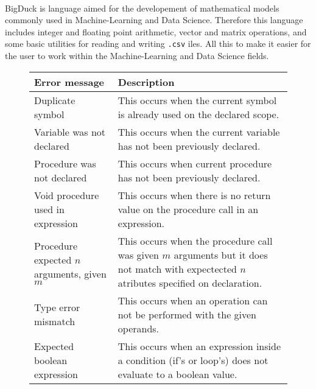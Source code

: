 \paragraph{} BigDuck is language aimed for the developement of mathematical
models commonly used in Machine-Learning and Data Science. Therefore this
language includes integer and floating point arithmetic, vector and matrix
operations, and some basic utilities for reading and writing \texttt{.csv} 
iles. All this to make it easier for the user to work within the
Machine-Learning and Data Science fields.

\begin{figure}[h]
    \centering
    \begin{tabular}{p{1.5in}p{2.5in}}
        \toprule
        \textbf{Error message} & \textbf{Description}\\

        \midrule Duplicate symbol &
        This occurs when the current symbol is already used on the declared
        scope.\\

        \midrule Variable was not \newline declared &
        This occurs when the current variable has not been \newline previously
        declared.\\

        \midrule Procedure was not \newline declared &
        This occurs when current procedure has not been \newline previously
        declared.\\

        \midrule Void procedure used \newline in expression &
        This occurs when there is no return value on the procedure call in
        an expression.\\

        \midrule Procedure expected $n$ \newline arguments, given $m$ &
        This occurs when the procedure call was given $m$ arguments but it
        does not match with expectected $n$ atributes specified on declaration.\\

        \midrule Type error mismatch &
        This occurs when an operation can not be performed with the given
        operands.\\

        \midrule Expected boolean \newline expression &
        This occurs when an expression inside a condition (if's or loop's) does
        not evaluate to a boolean value.\\


\end{tabular}
\end{figure}

